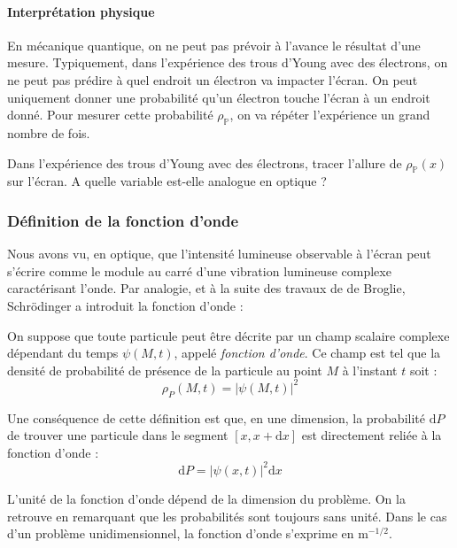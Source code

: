 \documentclass[11pt,fleqn]{book} %
\newcommand{\dd}{\mathrm{d}}
\begin{document}
\paragraph{Interprétation physique}

En mécanique quantique, on ne peut pas prévoir à l'avance le résultat d'une mesure. Typiquement, dans l'expérience des trous d'Young avec des électrons, on ne peut pas prédire à quel endroit un électron va impacter l'écran. On peut uniquement donner une probabilité qu'un électron touche l'écran à un endroit donné. Pour mesurer cette probabilité $\rho_\mathbb{P}$, on va répéter l'expérience un grand nombre de fois.

\begin{capex}
	Dans l'expérience des trous d'Young avec des électrons, tracer l'allure de $\rho_\mathbb{P}(x)$ sur l'écran. A quelle variable est-elle analogue en optique ?
\end{capex}

\subsubsection{Définition de la fonction d'onde}

Nous avons vu, en optique, que l'intensité lumineuse observable à l'écran peut s'écrire comme le module au carré d'une vibration lumineuse complexe caractérisant l'onde. Par analogie, et à la suite des travaux de de Broglie, Schrödinger a introduit la fonction d'onde :
\begin{theorem}
	On suppose que toute particule peut être décrite par un champ scalaire complexe dépendant du temps $\psi(M,t)$, appelé \textit{fonction d'onde}. Ce champ est tel que la densité de probabilité de présence de la particule au point $M$ à l'instant $t$ soit :
	\begin{equation}
		\rho_P(M,t) = |\psi(M,t)|^2
	\end{equation}
\end{theorem}

Une conséquence de cette définition est que, en une dimension, la probabilité $\dd P$ de trouver une particule dans le segment $[x,x+\dd x]$ est directement reliée à la fonction d'onde :
\begin{equation}
	\dd P = |\psi(x,t)|^2 \dd x
\end{equation}

\begin{remark}
	L'unité de la fonction d'onde dépend de la dimension du problème. On la retrouve en remarquant que les probabilités sont toujours sans unité. Dans le cas d'un problème unidimensionnel, la fonction d'onde s'exprime en m$^{-1/2}$. 
\end{remark}
\end{document}
